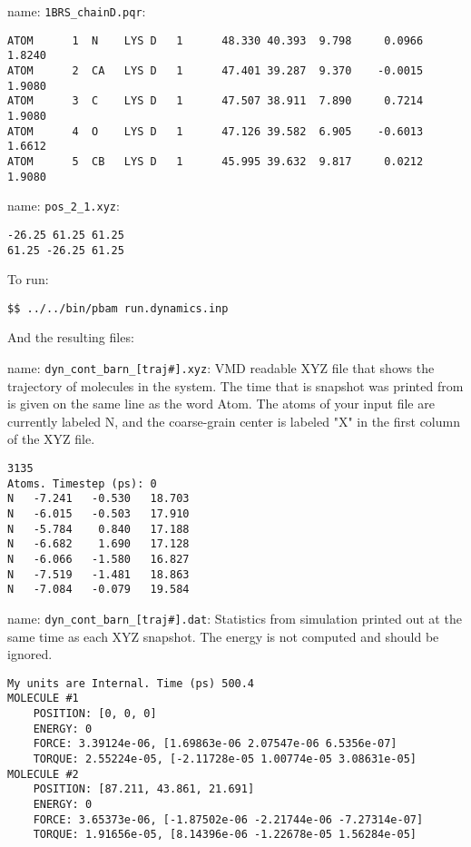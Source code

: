 name:  \texttt{1BRS\_chainD.pqr}:
\begin{lstlisting}[style = MyBash]
ATOM      1  N    LYS D   1      48.330 40.393  9.798     0.0966  1.8240
ATOM      2  CA   LYS D   1      47.401 39.287  9.370    -0.0015  1.9080
ATOM      3  C    LYS D   1      47.507 38.911  7.890     0.7214  1.9080
ATOM      4  O    LYS D   1      47.126 39.582  6.905    -0.6013  1.6612
ATOM      5  CB   LYS D   1      45.995 39.632  9.817     0.0212  1.9080
\end{lstlisting}

\medskip

name:  \texttt{pos\_2\_1.xyz}:
\begin{lstlisting}[style = MyBash]
-26.25 61.25 61.25
61.25 -26.25 61.25
\end{lstlisting}
\medskip

To run: 
\begin{lstlisting}[style = MyBash]
$$ ../../bin/pbam run.dynamics.inp
\end{lstlisting}
\medskip

And the resulting files: 

name: \texttt{dyn\_cont\_barn\_[traj\#].xyz}: VMD readable XYZ file that shows the trajectory of molecules in the system. The time that is snapshot was printed from is given on the same line as the word Atom. The atoms of your input file are currently labeled N, and the coarse-grain center is labeled "X" in the first column of the XYZ file.

\begin{lstlisting}[style = MyBash]
3135
Atoms. Timestep (ps): 0
N   -7.241   -0.530   18.703
N   -6.015   -0.503   17.910
N   -5.784    0.840   17.188
N   -6.682    1.690   17.128
N   -6.066   -1.580   16.827
N   -7.519   -1.481   18.863
N   -7.084   -0.079   19.584
\end{lstlisting}
\medskip

name: \texttt{dyn\_cont\_barn\_[traj\#].dat}: Statistics from simulation printed out at the same time as each XYZ snapshot. The energy is not computed and should be ignored.

\begin{lstlisting}[style = MyBash]
My units are Internal. Time (ps) 500.4
MOLECULE #1
	POSITION: [0, 0, 0]
	ENERGY: 0
	FORCE: 3.39124e-06, [1.69863e-06 2.07547e-06 6.5356e-07]
	TORQUE: 2.55224e-05, [-2.11728e-05 1.00774e-05 3.08631e-05]
MOLECULE #2
	POSITION: [87.211, 43.861, 21.691]
	ENERGY: 0
	FORCE: 3.65373e-06, [-1.87502e-06 -2.21744e-06 -7.27314e-07]
	TORQUE: 1.91656e-05, [8.14396e-06 -1.22678e-05 1.56284e-05]
\end{lstlisting}
\medskip

